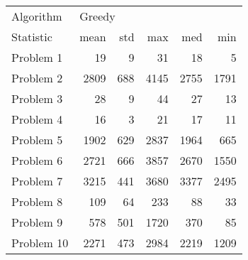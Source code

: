 \begin{tabular}{lrrrrr}
\toprule
Algorithm & \multicolumn{5}{l}{Greedy} \\
Statistic &   mean &  std &   max &   med &   min \\
\midrule
Problem 1  &     19 &    9 &    31 &    18 &     5 \\
Problem 2  &   2809 &  688 &  4145 &  2755 &  1791 \\
Problem 3  &     28 &    9 &    44 &    27 &    13 \\
Problem 4  &     16 &    3 &    21 &    17 &    11 \\
Problem 5  &   1902 &  629 &  2837 &  1964 &   665 \\
Problem 6  &   2721 &  666 &  3857 &  2670 &  1550 \\
Problem 7  &   3215 &  441 &  3680 &  3377 &  2495 \\
Problem 8  &    109 &   64 &   233 &    88 &    33 \\
Problem 9  &    578 &  501 &  1720 &   370 &    85 \\
Problem 10 &   2271 &  473 &  2984 &  2219 &  1209 \\
\bottomrule
\end{tabular}
